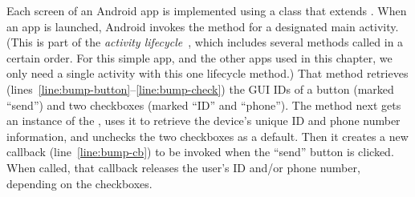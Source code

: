 Each screen of an Android app is implemented using a class that
extends . When an app is launched, Android invokes the
 method for a designated main activity.
(This is part of the \emph{activity lifecycle}~\cite{Android:15},
which includes several methods called in a certain order. For this
simple app, and the other apps used in this chapter, we only need a
single activity with this one lifecycle method.)
That method retrieves
(lines~\ref{line:bump-button}--\ref{line:bump-check}) the GUI IDs of a
button (marked ``send'') and
two checkboxes (marked ``ID'' and ``phone''). The  method next
gets an instance of the , uses it
to retrieve the device's unique ID and phone number information, and unchecks the two
checkboxes as a default. Then it creates a new callback
(line~\ref{line:bump-cb}) to be invoked when the ``send'' button is
clicked. When called, that callback releases the user's ID and/or
phone number, depending on the checkboxes.

